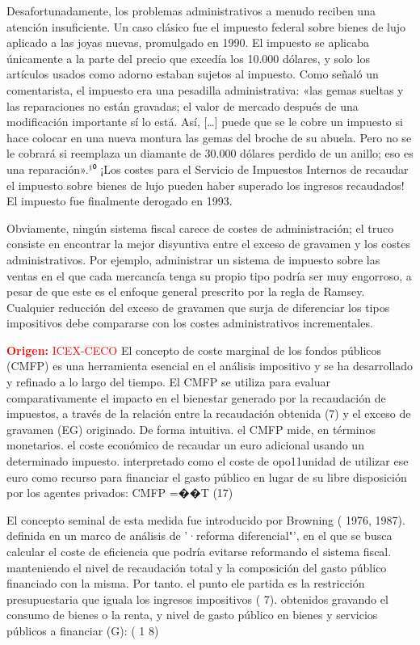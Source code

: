 \documentclass[10pt,a4paper]{article}
\begin{document}
Desafortunadamente, los problemas administrativos a menudo reciben una atención insuficiente. Un caso clásico fue el impuesto federal sobre bienes de lujo aplicado a las joyas nuevas, promulgado en 1990. El impuesto se aplicaba únicamente a la parte del precio que excedía los 10.000 dólares, y solo los artículos usados como adorno estaban sujetos al impuesto. Como señaló un comentarista, el impuesto era una pesadilla administrativa: «las gemas sueltas y las reparaciones no están gravadas; el valor de mercado después de una modificación importante sí lo está. Así, […] puede que se le cobre un impuesto si hace colocar en una nueva montura las gemas del broche de su abuela. Pero no se le cobrará si reemplaza un diamante de 30.000 dólares perdido de un anillo; eso es una reparación».¹⁰ ¡Los costes para el Servicio de Impuestos Internos de recaudar el impuesto sobre bienes de lujo pueden haber superado los ingresos recaudados! El impuesto fue finalmente derogado en 1993.

Obviamente, ningún sistema fiscal carece de costes de administración; el truco consiste en encontrar la mejor disyuntiva entre el exceso de gravamen y los costes administrativos. Por ejemplo, administrar un sistema de impuesto sobre las ventas en el que cada mercancía tenga su propio tipo podría ser muy engorroso, a pesar de que este es el enfoque general prescrito por la regla de Ramsey. Cualquier reducción del exceso de gravamen que surja de diferenciar los tipos impositivos debe compararse con los costes administrativos incrementales.


\textcolor{red}{\textbf{Origen:} ICEX-CECO}
El concepto de coste marginal de los fondos públicos (CMFP) es una herramienta esencial en el análisis impositivo y se ha desarrollado y refinado a lo largo del tiempo. El CMFP se utiliza para evaluar comparativamente el impacto en el bienestar generado por la recaudación de impuestos, a través de la relación entre la recaudación obtenida (7) y el exceso de gravamen (EG) originado. De forma intuitiva. el CMFP mide, en términos monetarios. el coste económico de recaudar un euro adicional usando un determinado impuesto. interpretado como el coste de opo11unidad de utilizar ese euro como recurso para financiar el gasto público en lugar de su libre disposición por los agentes privados:
CMFP =��T (17)

El concepto seminal de esta medida fue introducido por Browning ( 1976, 1987). definida en un marco de análisis de '·reforma diferencial"', en el que se busca calcular el coste de eficiencia que podría evitarse reformando el sistema fiscal. manteniendo el nivel de recaudación total y la composición del gasto público financiado con la misma. Por tanto. el punto ele partida es la restricción presupuestaria que iguala los ingresos impositivos ( 7). obtenidos gravando el consumo de bienes o la renta, y nivel de gasto público en bienes y servicios públicos a financiar (G):
( 1 8)
\end{document}
